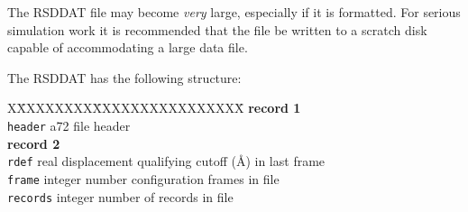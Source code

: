 The RSDDAT file may become {\em very} large, especially if it is
formatted.  For serious simulation work it is recommended that the
file be written to a scratch disk capable of accommodating a large
data file.

The RSDDAT has the following structure:
\begin{tabbing}
X\=XXXXXXXX\=XXXXXXXXXXXXXXXX\=\kill
{\bf record 1} \\
\> {\tt header}  \> a72     \> file header \\
{\bf record 2} \\
\> {\tt rdef}    \> real    \> displacement qualifying cutoff (\AA) in last frame \\
\> {\tt frame}   \> integer \> number configuration frames in file \\
\> {\tt records} \> integer \> number of records in file \\
\end{tabbing}

